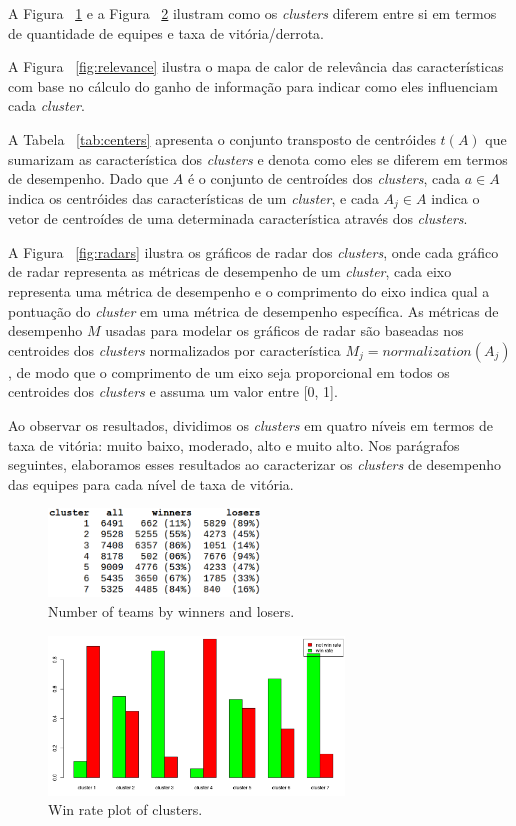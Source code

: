 A Figura ~\ref{fig:win-table} e a Figura ~\ref{fig:win-plot} ilustram como os \textit{clusters} diferem entre si em termos de quantidade de equipes e taxa de vitória/derrota.

A Figura ~\ref{fig:relevance} ilustra o mapa de calor de relevância das características com base no cálculo do ganho de informação para indicar como eles influenciam cada \textit{cluster}.

A Tabela ~\ref{tab:centers} apresenta o conjunto transposto de centróides $t(A)$ que sumarizam as característica dos \textit{clusters} e denota como eles se diferem em termos de desempenho. Dado que $A$ é o conjunto de centroídes dos \textit{clusters}, cada $a \in A$ indica os centróides das características de um \textit{cluster}, e cada $A_j \in A$ indica o vetor de centroídes de uma determinada característica através dos \textit{clusters}.

A Figura ~\ref{fig:radars} ilustra os gráficos de radar dos \textit{clusters}, onde cada gráfico de radar representa as métricas de desempenho de um \textit{cluster}, cada eixo representa uma métrica de desempenho e o comprimento do eixo indica qual a pontuação do \textit{cluster} em uma métrica de desempenho específica. As métricas de desempenho $M$ usadas para modelar os gráficos de radar são baseadas nos centroides dos \textit{clusters} normalizados por característica $M_j = normalization(A_j)$, de modo que o comprimento de um eixo seja proporcional em todos os centroides dos \textit{clusters} e assuma um valor entre [0, 1].

Ao observar os resultados, dividimos os \textit{clusters} em quatro níveis em termos de taxa de vitória: muito baixo, moderado, alto e muito alto. Nos parágrafos seguintes, elaboramos esses resultados ao caracterizar os \textit{clusters} de desempenho das equipes para cada nível de taxa de vitória.

\begin{figure}
  \centering
  \includegraphics[width=0.5\textwidth]{win-rate-table}%
  \caption{Number of teams by winners and losers.}
  \label{fig:win-table}
\end{figure}

\begin{figure}
  \centering
  \includegraphics[width=0.7\textwidth]{win-rate-plot}%
  \caption{Win rate plot of clusters.}
  \label{fig:win-plot}
\end{figure}

